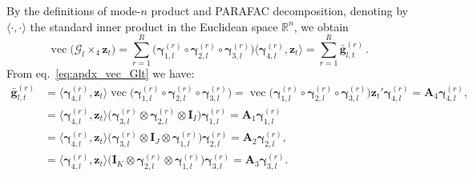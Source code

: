 \documentclass[12pt,a4paper]{article}
\DeclareMathOperator*{\vect}{vec}		%
\newcommand*\vecc[1]{\vect\big(#1\big)}
\def \R{\mathds{R}}
\theoremstyle{custom}
\begin{document}
By the definitions of mode-$n$ product and PARAFAC decomposition, denoting by $\langle \cdot, \cdot \rangle$ the standard inner product in the Euclidean space $\R^n$, we obtain
\begin{equation}
\vecc{\mathcal{G}_l \times_4 \mathbf{z}_t} = \sum_{r=1}^R \big( \boldsymbol{\gamma}_{1,l}^{(r)} \circ \boldsymbol{\gamma}_{2,l}^{(r)} \circ \boldsymbol{\gamma}_{3,l}^{(r)} \big) \langle \boldsymbol{\gamma}_{4,l}^{(r)}, \mathbf{z}_t \rangle = \sum_{r=1}^R \bar{\mathbf{g}}_{l,t}^{(r)} \, .
\label{eq:apdx_vec_Glt}
\end{equation}
From eq.~\eqref{eq:apdx_vec_Glt} we have:
\begin{align}
\label{eq:apdx_vect_tensor_G4}
\bar{\mathbf{g}}_{l,t}^{(r)} & = \langle \boldsymbol{\gamma}_{4,l}^{(r)}, \mathbf{z}_t \rangle \vecc{\boldsymbol{\gamma}_{1,l}^{(r)} \circ \boldsymbol{\gamma}_{2,l}^{(r)} \circ \boldsymbol{\gamma}_{3,l}^{(r)}} = \vecc{\boldsymbol{\gamma}_{1,l}^{(r)} \circ \boldsymbol{\gamma}_{2,l}^{(r)} \circ \boldsymbol{\gamma}_{3,l}^{(r)}} \mathbf{z}_t' \boldsymbol{\gamma}_{4,l}^{(r)} = \mathbf{A}_4 \boldsymbol{\gamma}_{4,l}^{(r)}, \\
\label{eq:apdx_vect_tensor_G1}
 & = \langle \boldsymbol{\gamma}_{4,l}^{(r)}, \mathbf{z}_t \rangle \big( \boldsymbol{\gamma}_{3,l}^{(r)} \otimes \boldsymbol{\gamma}_{2,l}^{(r)} \otimes \mathbf{I}_I \big) \boldsymbol{\gamma}_{1,l}^{(r)} = \mathbf{A}_1 \boldsymbol{\gamma}_{1,l}^{(r)} \\
\label{eq:apdx_vect_tensor_G2}
 & = \langle \boldsymbol{\gamma}_{4,l}^{(r)}, \mathbf{z}_t \rangle \big( \boldsymbol{\gamma}_{3,l}^{(r)} \otimes \mathbf{I}_J \otimes \boldsymbol{\gamma}_{1,l}^{(r)} \big) \boldsymbol{\gamma}_{2,l}^{(r)} = \mathbf{A}_2 \boldsymbol{\gamma}_{2,l}^{(r)}, \\
\label{eq:apdx_vect_tensor_G3}
 & = \langle \boldsymbol{\gamma}_{4,l}^{(r)}, \mathbf{z}_t \rangle \big( \mathbf{I}_K \otimes \boldsymbol{\gamma}_{2,l}^{(r)} \otimes \boldsymbol{\gamma}_{1,l}^{(r)} \big) \boldsymbol{\gamma}_{3,l}^{(r)} = \mathbf{A}_3 \boldsymbol{\gamma}_{3,l}^{(r)}.
\end{align}
\end{document}
